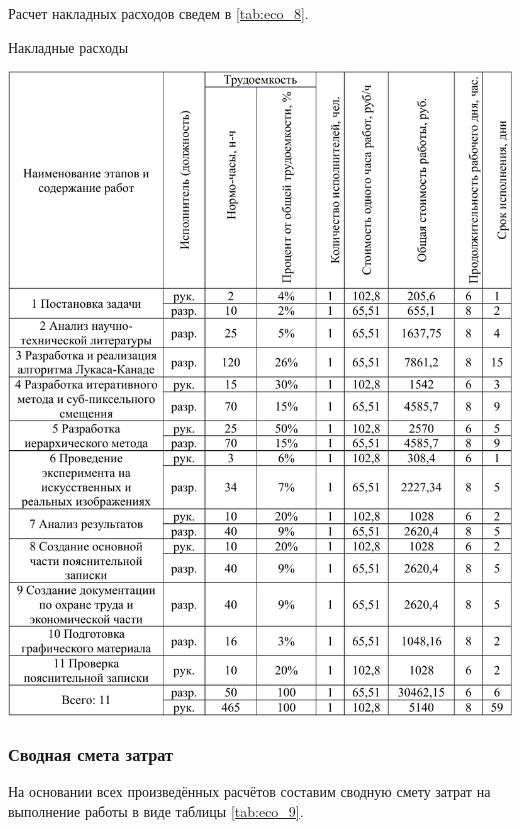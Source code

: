 Расчет накладных расходов сведем в \ref{tab:eco_8}.

\begin{table}[!ht]
\caption{Накладные расходы}
\centering
\includegraphics[page=8, width=1\linewidth]{econom_table.pdf}
\label{tab:eco_8}
\end{table}

\subsubsection{Сводная смета затрат}

На основании всех произведённых расчётов составим сводную смету затрат на выполнение работы в виде таблицы \ref{tab:eco_9}.

